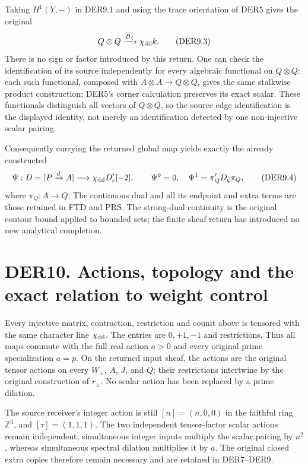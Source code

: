 Taking \(H^1(Y,-)\) in DER9.1 and using the trace orientation of DER5
gives the original \[
Q\otimes Q\xrightarrow{\overline B_\zeta}\chi_{\rm dil}k.
\tag{DER9.3}
\] There is no sign or factor introduced by this return. One can check
the identification of its source independently for every algebraic
functional on \(Q\otimes Q\): each such functional, composed with
\(A\otimes A\to Q\otimes Q\), gives the same stalkwise product
construction; DER5's corner calculation preserves its exact scalar.
These functionals distinguish all vectors of \(Q\otimes Q\), so the
source edge identification is the displayed identity, not merely an
identification detected by one non-injective scalar pairing.

Consequently currying the returned global map yields exactly the already
constructed \[
\Psi:D=[P\xrightarrow d A]\longrightarrow
 \chi_{\rm dil}D_c'[-2],\qquad
\Psi^0=0,\quad \Psi^1=\pi_Q'D_\zeta\pi_Q,
\tag{DER9.4}
\] where \(\pi_Q:A\to Q\). The continuous dual and all its endpoint and
extra terms are those retained in FTD and PRS. The strong-dual
continuity is the original contour bound applied to bounded sets; the
finite sheaf return has introduced no new analytical completion.

\section{DER10. Actions, topology and the exact relation to weight
control}\label{der10.-actions-topology-and-the-exact-relation-to-weight-control}

Every injective matrix, contraction, restriction and counit above is
tensored with the same character line \(\chi_{\rm dil}\). The entries
are \(0,+1,-1\) and restrictions. Thus all maps commute with the full
real action \(a>0\) and every original prime specialization \(a=p\). On
the returned input sheaf, the actions are the original tensor actions on
every \(W_\pm\), \(A\), \(J\), and \(Q\); their restrictions intertwine
by the original construction of \(r_\pm\). No scalar action has been
replaced by a prime dilation.

The source receiver's integer action is still \([n]=(n,0,0)\) in the
faithful ring \(\mathbb Z^3\), and \([\tau]=(1,1,1)\). The two
independent tensor-factor scalar actions remain independent;
simultaneous integer inputs multiply the scalar pairing by \(n^2\),
whereas simultaneous spectral dilation multiplies it by \(a\). The
original closed extra copies therefore remain necessary and are retained
in DER7--DER9.

